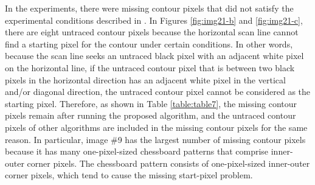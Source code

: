 
In the experiments, there were missing contour pixels that did not satisfy the experimental conditions described in \cite{Miyatake1997Contour}. In Figures \ref{fig:img21-b} and \ref{fig:img21-c}, there are eight untraced contour pixels because the horizontal scan line cannot find a starting pixel for the contour under certain conditions. In other words, because the scan line seeks an untraced black pixel with an adjacent white pixel on the horizontal line, if the untraced contour pixel that is between two black pixels in the horizontal direction has an adjacent white pixel in the vertical and/or diagonal direction, the untraced contour pixel cannot be considered as the starting pixel. Therefore, as shown in Table \ref{table:table7}, the missing contour pixels remain after running the proposed algorithm, and the untraced contour pixels of other algorithms are included in the missing contour pixels for the same reason. In particular, image \#9 has the largest number of missing contour pixels because it has many one-pixel-sized chessboard patterns that comprise inner-outer corner pixels. The chessboard pattern consists of one-pixel-sized inner-outer corner pixels, which tend to cause the missing start-pixel problem. 

